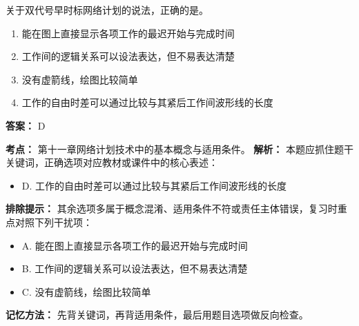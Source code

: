 \documentclass[UTF8,fontset=fandol,11pt]{ctexart}
\begin{document}
\begin{quizbox}[title={第 11 题}]
关于双代号早时标网络计划的说法，正确的是。\\
\begin{enumerate}[label=\Alph*.]
\item 能在图上直接显示各项工作的最迟开始与完成时间
\item 工作间的逻辑关系可以设法表达，但不易表达清楚
\item 没有虚箭线，绘图比较简单
\item 工作的自由时差可以通过比较与其紧后工作间波形线的长度
\end{enumerate}
\textbf{答案：} D
\vspace{0.25em}
\begin{answerbox}[title={考点解析}]
\textbf{考点：} 第十一章网络计划技术中的基本概念与适用条件。
\textbf{解析：} 本题应抓住题干关键词，正确选项对应教材或课件中的核心表述：
\begin{itemize}
\item D. 工作的自由时差可以通过比较与其紧后工作间波形线的长度
\end{itemize}
\textbf{排除提示：} 其余选项多属于概念混淆、适用条件不符或责任主体错误，复习时重点对照下列干扰项：
\begin{itemize}
\item A. 能在图上直接显示各项工作的最迟开始与完成时间
\item B. 工作间的逻辑关系可以设法表达，但不易表达清楚
\item C. 没有虚箭线，绘图比较简单
\end{itemize}
\textbf{记忆方法：} 先背关键词，再背适用条件，最后用题目选项做反向检查。
\end{answerbox}
\end{quizbox}

\vspace{0.2em}
\end{document}
